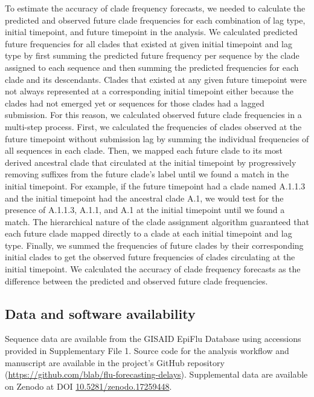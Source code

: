 \documentclass[9pt,lineno]{elife}
\begin{document}
To estimate the accuracy of clade frequency forecasts, we needed to calculate the predicted and observed future clade frequencies for each combination of lag type, initial timepoint, and future timepoint in the analysis.
We calculated predicted future frequencies for all clades that existed at given initial timepoint and lag type by first summing the predicted future frequency per sequence by the clade assigned to each sequence and then summing the predicted frequencies for each clade and its descendants.
Clades that existed at any given future timepoint were not always represented at a corresponding initial timepoint either because the clades had not emerged yet or sequences for those clades had a lagged submission.
For this reason, we calculated observed future clade frequencies in a multi-step process.
First, we calculated the frequencies of clades observed at the future timepoint without submission lag by summing the individual frequencies of all sequences in each clade.
Then, we mapped each future clade to its most derived ancestral clade that circulated at the initial timepoint by progressively removing suffixes from the future clade's label until we found a match in the initial timepoint.
For example, if the future timepoint had a clade named A.1.1.3 and the initial timepoint had the ancestral clade A.1, we would test for the presence of A.1.1.3, A.1.1, and A.1 at the initial timepoint until we found a match.
The hierarchical nature of the clade assignment algorithm guaranteed that each future clade mapped directly to a clade at each initial timepoint and lag type.
Finally, we summed the frequencies of future clades by their corresponding initial clades to get the observed future frequencies of clades circulating at the initial timepoint.
We calculated the accuracy of clade frequency forecasts as the difference between the predicted and observed future clade frequencies.

\subsection*{Data and software availability}

Sequence data are available from the GISAID EpiFlu Database using accessions provided in Supplementary File 1.
Source code for the analysis workflow and manuscript are available in the project's GitHub repository (\url{https://github.com/blab/flu-forecasting-delays}).
Supplemental data are available on Zenodo at DOI \href{https://doi.org/10.5281/zenodo.17259448}{10.5281/zenodo.17259448}.
\end{document}
